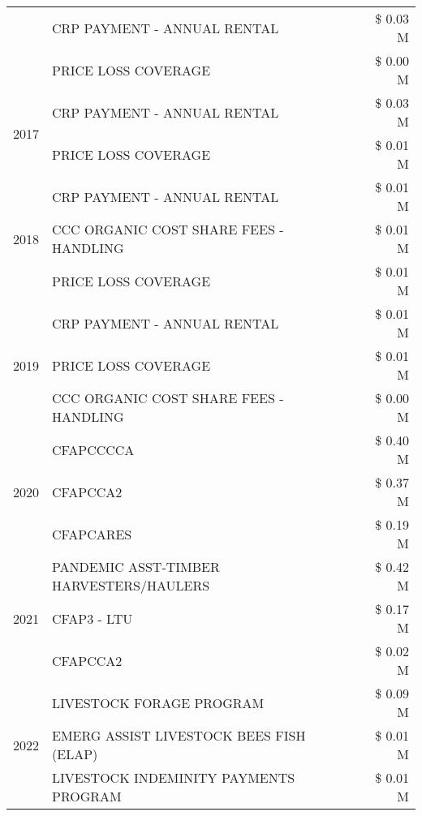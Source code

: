 \begin{tabular}{llr}
 & CRP PAYMENT - ANNUAL RENTAL & \$ 0.03 M \\
 & PRICE LOSS COVERAGE & \$ 0.00 M \\
\cline{1-3}
\multirow[t]{2}{*}{2017} & CRP PAYMENT - ANNUAL RENTAL & \$ 0.03 M \\
 & PRICE LOSS COVERAGE & \$ 0.01 M \\
\cline{1-3}
\multirow[t]{3}{*}{2018} & CRP PAYMENT - ANNUAL RENTAL & \$ 0.01 M \\
 & CCC ORGANIC COST SHARE FEES - HANDLING & \$ 0.01 M \\
 & PRICE LOSS COVERAGE & \$ 0.01 M \\
\cline{1-3}
\multirow[t]{3}{*}{2019} & CRP PAYMENT - ANNUAL RENTAL & \$ 0.01 M \\
 & PRICE LOSS COVERAGE & \$ 0.01 M \\
 & CCC ORGANIC COST SHARE FEES - HANDLING & \$ 0.00 M \\
\cline{1-3}
\multirow[t]{3}{*}{2020} & CFAPCCCCA & \$ 0.40 M \\
 & CFAPCCA2 & \$ 0.37 M \\
 & CFAPCARES & \$ 0.19 M \\
\cline{1-3}
\multirow[t]{3}{*}{2021} & PANDEMIC ASST-TIMBER HARVESTERS/HAULERS & \$ 0.42 M \\
 & CFAP3 - LTU & \$ 0.17 M \\
 & CFAPCCA2 & \$ 0.02 M \\
\cline{1-3}
\multirow[t]{3}{*}{2022} & LIVESTOCK FORAGE PROGRAM & \$ 0.09 M \\
 & EMERG ASSIST LIVESTOCK BEES FISH (ELAP) & \$ 0.01 M \\
 & LIVESTOCK INDEMINITY PAYMENTS PROGRAM & \$ 0.01 M \\
\cline{1-3}
\bottomrule
\end{tabular}
